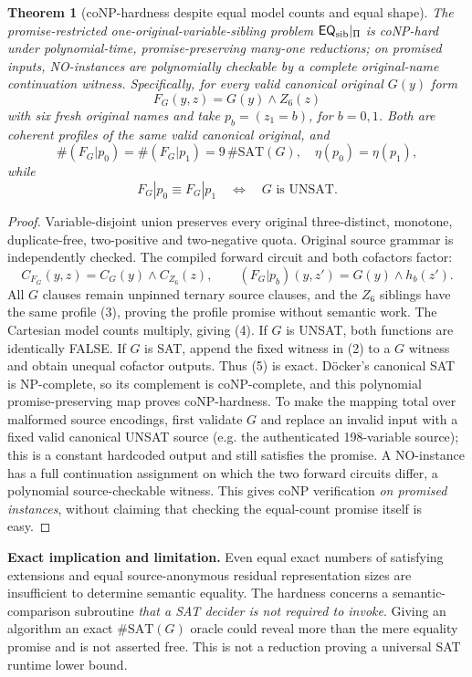 \documentclass[11pt]{article}
\newtheorem{theorem}{Theorem}
\begin{document}
\begin{theorem}[coNP-hardness despite equal model counts and equal shape]
The promise-restricted one-original-variable-sibling problem $\mathsf{EQ}_{\rm sib}|_\Pi$ is coNP-hard under polynomial-time, promise-preserving many-one reductions; on promised inputs, NO-instances are polynomially checkable by a complete original-name continuation witness. Specifically, for every valid canonical original $G(y)$ form
\[
F_G(y,z)=G(y)\land Z_6(z)
\]
with six fresh original names and take $p_b=(z_1=b)$, for $b=0,1$. Both are coherent profiles of the \emph{same valid canonical original}, and
\[
\#(F_G|p_0)=\#(F_G|p_1)=9\,\#\mathrm{SAT}(G),
\quad
\eta(p_0)=\eta(p_1),
\tag{4}
\]
while
\[
\boxed{F_G|p_0\equiv F_G|p_1\quad\Longleftrightarrow\quad G\text{ is UNSAT}.}
\tag{5}
\]
\end{theorem}
\begin{proof}
Variable-disjoint union preserves every original three-distinct, monotone, duplicate-free, two-positive and two-negative quota. Original source grammar is independently checked. The compiled forward circuit and both cofactors factor:
\[
C_{F_G}(y,z)=C_G(y)\land C_{Z_6}(z),\qquad
(F_G|p_b)(y,z')=G(y)\land h_b(z').
\tag{6}
\]
All $G$ clauses remain unpinned ternary source clauses, and the $Z_6$ siblings have the same profile (3), proving the profile promise without semantic work. The Cartesian model counts multiply, giving (4). If $G$ is UNSAT, both functions are identically FALSE. If $G$ is SAT, append the fixed witness in (2) to a $G$ witness and obtain unequal cofactor outputs. Thus (5) is exact. D\"ocker's canonical SAT is NP-complete, so its complement is coNP-complete, and this polynomial promise-preserving map proves coNP-hardness. To make the mapping total over malformed source encodings, first validate $G$ and replace an invalid input with a fixed valid canonical UNSAT source (e.g. the authenticated 198-variable source); this is a constant hardcoded output and still satisfies the promise. A NO-instance has a full continuation assignment on which the two forward circuits differ, a polynomial source-checkable witness. This gives coNP verification \emph{on promised instances}, without claiming that checking the equal-count promise itself is easy.
\end{proof}

\noindent\textbf{Exact implication and limitation.} Even equal exact numbers of satisfying extensions and equal source-anonymous residual representation sizes are insufficient to determine semantic equality. The hardness concerns a semantic-comparison subroutine \emph{that a SAT decider is not required to invoke}. Giving an algorithm an exact $\#\mathrm{SAT}(G)$ oracle could reveal more than the mere equality promise and is not asserted free. This is not a reduction proving a universal SAT runtime lower bound.
\end{document}
